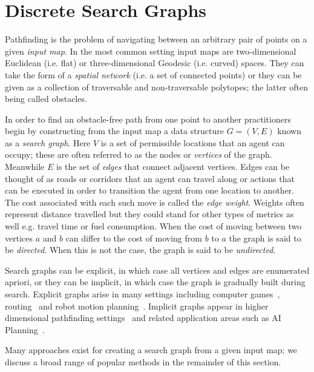 \section{Discrete Search Graphs}
\label{cha::lit::graphs}
Pathfinding is the problem of navigating between an arbitrary pair of points on
a given \emph{input map}.  In the most common setting input maps are
two-dimensional Euclidean (i.e. flat) or three-dimensional Geodesic (i.e. curved) 
spaces. They can take the form of a \emph{spatial network} (i.e. a set of
connected points) or they can be given as a collection of traversable and
non-traversable polytopes; the latter often being called obstacles.

In order to find an obstacle-free path from one point to another practitioners
begin by constructing from the input map a data structure $G = (V, E)$
known as a \emph{search graph}.  Here $V$ is a set of permissible locations that
an agent can occupy; these are often referred to as the nodes or \emph{vertices}
of the graph.  Meanwhile $E$ is the set of \emph{edges} that connect adjacent
vertices.  Edges can be thought of as roads or corridors that an agent can
travel along or actions that can be executed in order to transition the agent
from one location to another.
The cost associated with each such move is called the \emph{edge weight}.
Weights often represent distance travelled but they could stand for other types
of metrics as well e.g. travel time or fuel consumption.  When the cost of
moving between two vertices $a$ and $b$ can differ to the cost of moving from $b$ to
$a$ the graph is said to be \emph{directed}.  When this is not the case, the
graph is said to be \emph{undirected}.  

Search graphs can be explicit, in which case all vertices and edges are
enumerated apriori, or they can be implicit, in which case the graph is
gradually built during search. Explicit graphs arise in many settings including
computer games~\citep{davis00,tozour02,champandard09}, 
routing~\citep{sanders05,goldberg06} and robot motion
planning~\citep{latombe91,choset05}.  Implicit graphs appear in higher
dimensional pathfinding settings~\citep{lavalle98,bohlin00} and related
application areas such as AI Planning~\citep{russel03}.  

Many approaches exist for creating a search graph from a given input map; we
discuss a broad range of popular methods in the remainder of this section.

